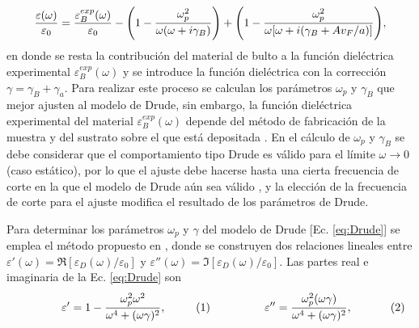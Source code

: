 %
	\begin{align}
	\frac{\varepsilon(\omega)}{\varepsilon_0} = \frac{\varepsilon_B^{exp}(\omega)}{\varepsilon_0}
						 - \qty( 1 - \frac{\omega_p^2}{\omega(\omega+i\gamma_B)}) 
						 + \qty( 1 - \frac{\omega_p^2}{\omega[\omega+i(\gamma_B + Av_F/a)]}),
			\label{eq:sizeCorrection}
	\end{align}
%
en donde se resta la contribución del material de bulto  a la función dieléctrica experimental $ \varepsilon_B^{exp}(\omega)$ y se introduce la función dieléctrica con la corrección $\gamma = \gamma_B+\gamma_a$. Para realizar este proceso se calculan los parámetros $\omega_p$ y $\gamma_B$ que mejor ajusten al modelo de Drude, sin embargo, la función dieléctrica experimental del material $\varepsilon_B^{exp}(\omega)$ depende del método de fabricación de la muestra y del sustrato sobre el que está depositada \cite{svetovoy2008optical,raja2019dielectric}. En el cálculo de $\omega_p$ y $\gamma_B$ se debe considerar que el comportamiento tipo Drude es válido para el límite $\omega\to 0$ (caso estático), por lo que el ajuste debe hacerse hasta una cierta frecuencia de corte en la que el modelo de Drude aún sea válido \cite{mendoza2014determination}, y la elección de la frecuencia de corte para el ajuste modifica el resultado de los parámetros de Drude.

Para determinar los parámetros $\omega_p$ y $\gamma$ del modelo de Drude [Ec. \eqref{eq:Drude}] se emplea el método propuesto en \cite{mendoza2014determination}, donde se construyen dos relaciones lineales entre $\varepsilon'(\omega) = \Re[\varepsilon_D(\omega)/\varepsilon_0]$ y $\varepsilon''(\omega)=\Im[\varepsilon_D(\omega)/\varepsilon_0]$. Las partes real e imaginaria de la Ec. \eqref{eq:Drude} son \vspace*{-1em}\begin{subequations}

	\eqhalf{\varepsilon' =
		 1 - \frac{\omega_p^2 \omega^2}{\omega^4 + (\omega\gamma)^2},
		 \label{eqs:ReDrude}}
	\eqhalf{\varepsilon'' =
		 \frac{\omega_p^2  (\omega\gamma)}{\omega^4 + (\omega\gamma)^2},
		 \label{eqs:ImDrude}
			}\end{subequations} 
			
